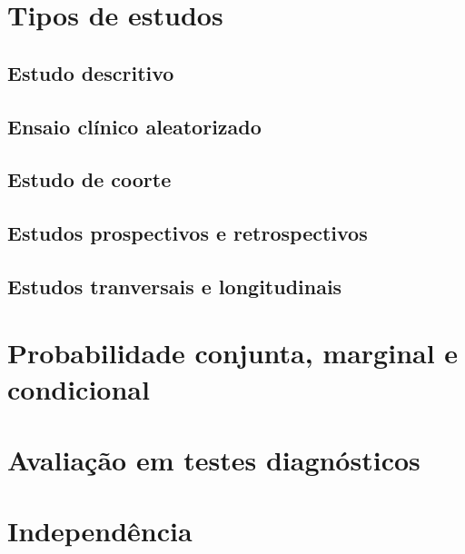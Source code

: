 \documentclass[]{book}
\begin{document}
\hypertarget{tipos-de-estudos}{%
\section{Tipos de estudos}\label{tipos-de-estudos}}

\hypertarget{estudo-descritivo}{%
\subsection{Estudo descritivo}\label{estudo-descritivo}}

\hypertarget{ensaio-clinico-aleatorizado}{%
\subsection{Ensaio clínico aleatorizado}\label{ensaio-clinico-aleatorizado}}

\hypertarget{estudo-de-coorte}{%
\subsection{Estudo de coorte}\label{estudo-de-coorte}}

\hypertarget{estudos-prospectivos-e-retrospectivos}{%
\subsection{Estudos prospectivos e retrospectivos}\label{estudos-prospectivos-e-retrospectivos}}

\hypertarget{estudos-tranversais-e-longitudinais}{%
\subsection{Estudos tranversais e longitudinais}\label{estudos-tranversais-e-longitudinais}}

\hypertarget{probabilidade-conjunta-marginal-e-condicional}{%
\section{Probabilidade conjunta, marginal e condicional}\label{probabilidade-conjunta-marginal-e-condicional}}

\hypertarget{avaliacao-em-testes-diagnosticos}{%
\section{Avaliação em testes diagnósticos}\label{avaliacao-em-testes-diagnosticos}}

\hypertarget{independencia}{%
\section{Independência}\label{independencia}}
\end{document}
